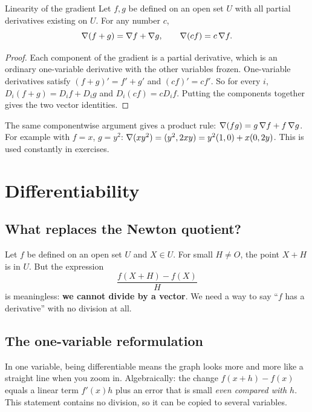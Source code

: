 \begin{theorem}{Linearity of the gradient}
Let $f,g$ be defined on an open set $U$ with all partial derivatives existing on $U$.
For any number $c$,
\[
\nabla(f+g)=\nabla f+\nabla g,\qquad \nabla(cf)=c\,\nabla f .
\]
\end{theorem}

\begin{proof}
Each component of the gradient is a partial derivative, which is an ordinary
one-variable derivative with the other variables frozen. One-variable derivatives
satisfy $(f+g)'=f'+g'$ and $(cf)'=cf'$. So for every $i$,
$D_i(f+g)=D_if+D_ig$ and $D_i(cf)=cD_if$. Putting the components together gives the
two vector identities.
\end{proof}

\begin{extra}
The same componentwise argument gives a product rule:
$\nabla(fg)=g\,\nabla f+f\,\nabla g$. For example with $f=x$, $g=y^2$:
$\nabla(xy^2)=(y^2,2xy)=y^2(1,0)+x(0,2y)$. This is used constantly in exercises.
\end{extra}

\section{Differentiability}

\subsection{What replaces the Newton quotient?}

Let $f$ be defined on an open set $U$ and $X\in U$. For small $H\neq O$, the point
$X+H$ is in $U$. But the expression
\[ \frac{f(X+H)-f(X)}{H} \]
is meaningless: \textbf{we cannot divide by a vector}. We need a way to say
``$f$ has a derivative'' with no division at all.

\subsection{The one-variable reformulation}

\begin{intuition}
In one variable, being differentiable means the graph looks more and more like a
straight line when you zoom in. Algebraically: the change $f(x+h)-f(x)$ equals a
linear term $f'(x)h$ plus an error that is small \emph{even compared with $h$}. This
statement contains no division, so it can be copied to several variables.
\end{intuition}

